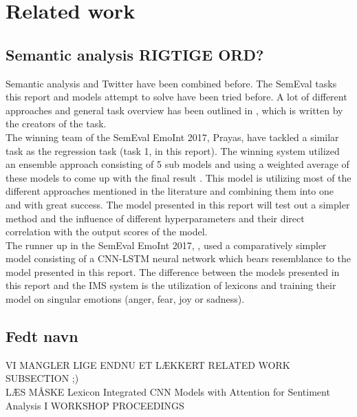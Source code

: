 
\section{Related work}

\subsection{Semantic analysis RIGTIGE ORD?}

Semantic analysis and Twitter have been combined before. The SemEval tasks this report and models attempt to solve have been tried before. A lot of different approaches and general task overview has been outlined in \cite{wassa2017}, which is written by the creators of the task.\\
The winning team of the SemEval EmoInt 2017, Prayas, have tackled a similar task as the regression task (task 1, in this report). The winning system utilized an ensemble approach consisting of 5 sub models and using a weighted average of these models to come up with the final result \cite{prayas}. This model is utilizing most of the different approaches mentioned in the literature and combining them into one and with great success. The model presented in this report will test out a simpler method and the influence of different hyperparameters and their direct correlation with the output scores of the model.\\
The runner up in the SemEval EmoInt 2017, \cite{ims}, used a comparatively simpler model consisting of a CNN-LSTM neural network which bears resemblance to the model presented in this report. The difference between the models presented in this report and the IMS system is the utilization of lexicons and training their model on singular emotions (anger, fear, joy or sadness).\\

\subsection{Fedt navn}

VI MANGLER LIGE ENDNU ET LÆKKERT RELATED WORK SUBSECTION ;)\\
LÆS MÅSKE Lexicon Integrated CNN Models with Attention for Sentiment Analysis I WORKSHOP PROCEEDINGS